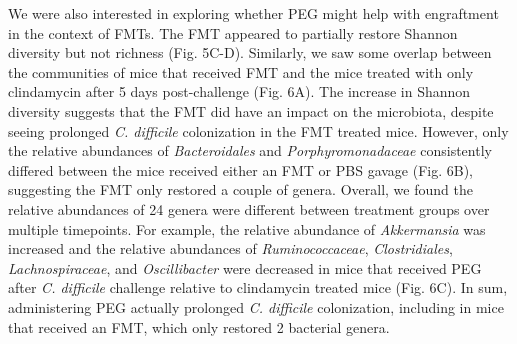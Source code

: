 \documentclass[
  11pt,
]{article}
\begin{document}
We were also interested in exploring whether PEG might help with
engraftment in the context of FMTs. The FMT appeared to partially
restore Shannon diversity but not richness (Fig. 5C-D). Similarly, we
saw some overlap between the communities of mice that received FMT and
the mice treated with only clindamycin after 5 days post-challenge (Fig.
6A). The increase in Shannon diversity suggests that the FMT did have an
impact on the microbiota, despite seeing prolonged \emph{C. difficile}
colonization in the FMT treated mice. However, only the relative
abundances of \emph{Bacteroidales} and \emph{Porphyromonadaceae}
consistently differed between the mice received either an FMT or PBS
gavage (Fig. 6B), suggesting the FMT only restored a couple of genera.
Overall, we found the relative abundances of 24 genera were different
between treatment groups over multiple timepoints. For example, the
relative abundance of \emph{Akkermansia} was increased and the relative
abundances of \emph{Ruminococcaceae}, \emph{Clostridiales},
\emph{Lachnospiraceae}, and \emph{Oscillibacter} were decreased in mice
that received PEG after \emph{C. difficile} challenge relative to
clindamycin treated mice (Fig. 6C). In sum, administering PEG actually
prolonged \emph{C. difficile} colonization, including in mice that
received an FMT, which only restored 2 bacterial genera.
\end{document}
